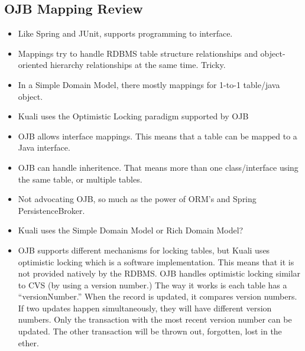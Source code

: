 \begin{ifhtml}
    \begin{s5slide}
      \section {OJB Mapping Review}
      \begin{itemize}
        \item Like Spring and JUnit, supports programming to interface.
        \item Mappings try to handle RDBMS table structure relationships and object-oriented hierarchy relationships
           at the same time. Tricky.
         \item In a Simple Domain Model, there mostly mappings for 1-to-1 table/java object.
         \item Kuali uses the Optimistic Locking paradigm supported by OJB
      \end{itemize}
      
      \begin{s5notes}
        \begin{itemize}
          \item OJB allows interface mappings. This means that a table can be mapped to a Java interface.
          \item OJB can handle inheritence. That means more than one class/interface using the same table, 
            or multiple tables.
          \item Not advocating OJB, so much as the power of ORM's and Spring PersistenceBroker.
          \item Kuali uses the Simple Domain Model or Rich Domain Model?
          \item OJB supports different mechanisms for locking tables, but Kuali uses optimistic locking which
            is a software implementation. This means that it is not provided natively by the RDBMS. OJB handles 
            optimistic locking similar to CVS (by using a version number.) The way it works is each table has a
            ``versionNumber.'' When the record is updated, it compares version numbers. If two updates happen
            simultaneously, they will have different version numbers. Only the transaction with the most recent
            version number can be updated. The other transaction will be thrown out, forgotten, lost in the ether.
        \end{itemize}
      \end{s5notes}
    \end{s5slide}


\end{ifhtml}
